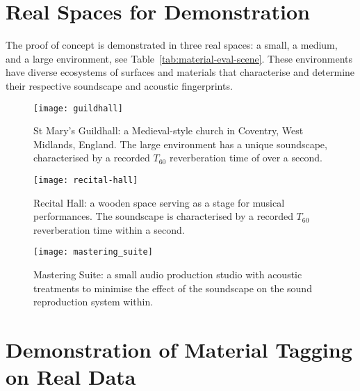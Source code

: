 \section{Real Spaces for Demonstration}
The proof of concept is demonstrated in three real spaces: a small, a medium, and a large environment, see Table~\ref{tab:material-eval-scene}. These environments have diverse ecosystems of surfaces and materials that characterise and determine their respective soundscape and acoustic fingerprints.


\begin{figure}[htbp]
    \centering
    \texttt{[image: guildhall]}
    \caption[Proof of concept demonstration --- large environment]{St Mary's Guildhall: a Medieval-style church in Coventry, West Midlands, England. The large environment has a unique soundscape, characterised by a recorded $T_{60}$ reverberation time of over a second.}
    \label{fig:guildhall-iso-render}
\end{figure}

\begin{figure}[htbp]
    \centering
    \texttt{[image: recital-hall]}
    \caption[Proof of concept demonstration --- medium environment]{Recital Hall: a wooden space serving as a stage for musical performances. The soundscape is characterised by a recorded $T_{60}$ reverberation time within a second.}
    \label{fig:conservatoire-iso-render}
\end{figure}

\begin{figure}[htbp]
    \centering
    \texttt{[image: mastering\_suite]}
    \caption[Proof of concept demonstration --- small environment]{Mastering Suite: a small audio production studio with acoustic treatments to minimise the effect of the soundscape on the sound reproduction system within.}
    \label{fig:mastering-iso-render}
\end{figure}

\section{Demonstration of Material Tagging on Real Data}

